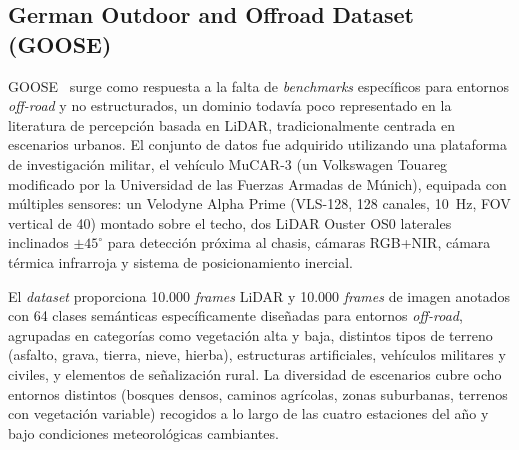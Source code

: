 \subsection{German Outdoor and Offroad Dataset (GOOSE)}
\label{sec:goose}

GOOSE~\cite{mortimer2024goose} surge como respuesta a la falta de
\textit{benchmarks} específicos para entornos \textit{off-road} y no
estructurados, un dominio todavía poco representado en la literatura de
percepción basada en LiDAR, tradicionalmente centrada en escenarios
urbanos. El conjunto de datos fue adquirido utilizando una plataforma
de investigación militar, el vehículo MuCAR-3 (un Volkswagen Touareg
modificado por la Universidad de las Fuerzas Armadas de Múnich),
equipada con múltiples sensores: un Velodyne Alpha Prime (VLS-128, 128
canales, 10~Hz, FOV vertical de 40\textdegree) montado sobre el techo,
dos LiDAR Ouster OS0 laterales inclinados $\pm 45^{\circ}$ para
detección próxima al chasis, cámaras RGB+NIR, cámara térmica infrarroja
y sistema de posicionamiento inercial.

El \textit{dataset} proporciona 10.000 \textit{frames} LiDAR y 10.000
\textit{frames} de imagen anotados con 64 clases semánticas
específicamente diseñadas para entornos \textit{off-road}, agrupadas en
categorías como vegetación alta y baja, distintos tipos de terreno
(asfalto, grava, tierra, nieve, hierba), estructuras artificiales,
vehículos militares y civiles, y elementos de señalización rural. La
diversidad de escenarios cubre ocho entornos distintos (bosques densos,
caminos agrícolas, zonas suburbanas, terrenos con vegetación variable)
recogidos a lo largo de las cuatro estaciones del año y bajo
condiciones meteorológicas cambiantes.
